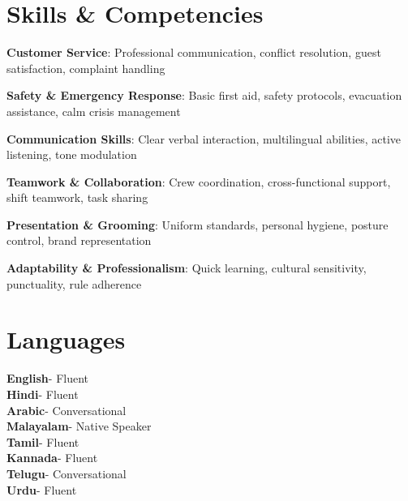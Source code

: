\documentclass[a4paper,11pt]{article}
\begin{document}
\section{Skills \& Competencies}
\begin{itemize}[leftmargin=0.15in, label={}, itemsep=0pt]
	\small{
		\item \textbf{Customer Service}: Professional communication, conflict resolution, guest satisfaction, complaint handling
		\item \textbf{Safety \& Emergency Response}: Basic first aid, safety protocols, evacuation assistance, calm crisis management
		\item \textbf{Communication Skills}: Clear verbal interaction, multilingual abilities, active listening, tone modulation
		\item \textbf{Teamwork \& Collaboration}: Crew coordination, cross-functional support, shift teamwork, task sharing
		\item \textbf{Presentation \& Grooming}: Uniform standards, personal hygiene, posture control, brand representation
		\item \textbf{Adaptability \& Professionalism}: Quick learning, cultural sensitivity, punctuality, rule adherence
	}
\end{itemize}

\section{Languages}
\begin{itemize}[leftmargin=0.15in, label={}]
    \small{\item{
                \textbf{English}{- Fluent}\\
                \textbf{Hindi}{- Fluent}\\
                \textbf{Arabic}{- Conversational}\\
                \textbf{Malayalam}{- Native Speaker}\\
                \textbf{Tamil}{- Fluent}\\
                \textbf{Kannada}{- Fluent}\\
                \textbf{Telugu}{- Conversational}\\
                \textbf{Urdu}{- Fluent}
                }}
\end{itemize}
\end{document}

